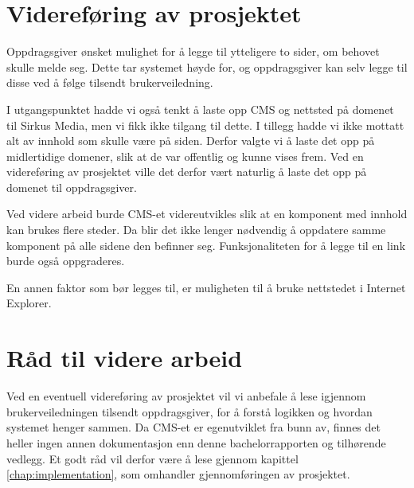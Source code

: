 \section{Videreføring av prosjektet}
Oppdragsgiver ønsket mulighet for å legge til ytteligere to sider, om behovet skulle melde seg. Dette tar systemet høyde for, og oppdragsgiver kan selv legge til disse ved å følge tilsendt brukerveiledning.

I utgangspunktet hadde vi også tenkt å laste opp CMS og nettsted på domenet til Sirkus Media, men vi fikk ikke tilgang til dette. I tillegg hadde vi ikke mottatt alt av innhold som skulle være på siden. Derfor valgte vi å laste det opp på midlertidige domener, slik at de var offentlig og kunne vises frem. Ved en videreføring av prosjektet ville det derfor vært naturlig å laste det opp på domenet til oppdragsgiver.

Ved videre arbeid burde CMS-et videreutvikles slik at en komponent med innhold kan brukes flere steder. Da blir det ikke lenger nødvendig å oppdatere samme komponent på alle sidene den befinner seg. Funksjonaliteten for å legge til en link burde også oppgraderes.

En annen faktor som bør legges til, er muligheten til å bruke nettstedet i Internet Explorer.

\section{Råd til videre arbeid}
Ved en eventuell videreføring av prosjektet vil vi anbefale å lese igjennom brukerveiledningen tilsendt oppdragsgiver, for å forstå logikken og hvordan systemet henger sammen. Da CMS-et er egenutviklet fra bunn av, finnes det heller ingen annen dokumentasjon enn denne bachelorrapporten og tilhørende vedlegg. Et godt råd vil derfor være å lese gjennom kapittel \ref{chap:implementation}, som omhandler gjennomføringen av prosjektet.




